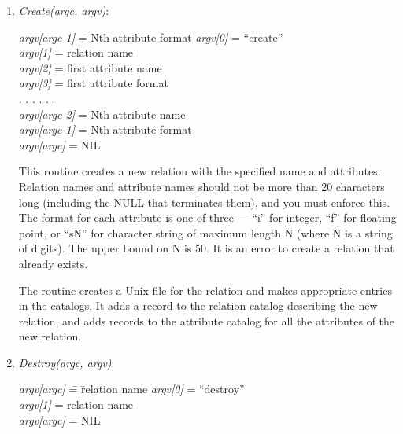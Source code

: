 \begin{enumerate}
\item\emph{Create(argc, argv)}:
\begin{tabbing}
\hspace*{0.2in}\emph{argv[argc-1]} \= = \= Nth attribute format   \kill
\hspace*{0.2in}\emph{argv[0]}      \> = \> ``create''             \\
\hspace*{0.2in}\emph{argv[1]}      \> = \> relation name          \\
\hspace*{0.2in}\emph{argv[2]}      \> = \> first attribute name   \\
\hspace*{0.2in}\emph{argv[3]}      \> = \> first attribute format \\
\hspace*{0.2in}    . . .	     \>   \>   . . .                \\
\hspace*{0.2in}\emph{argv[argc-2]} \> = \> Nth attribute name     \\
\hspace*{0.2in}\emph{argv[argc-1]} \> = \> Nth attribute format   \\
\hspace*{0.2in}\emph{argv[argc]}   \> = \> NIL
\end{tabbing}

This routine creates a new relation with the specified name and
attributes.  Relation names and attribute names should not be more than
20 characters long (including the NULL that terminates them), and you
must enforce this.  The format for each attribute is one of three ---
``i'' for integer, ``f'' for floating point, or ``sN'' for character
string of maximum length N (where N is a string of digits).  The upper
bound on N is 50.  It is an error to create a relation that already
exists.

The routine creates a Unix file for the relation and makes appropriate
entries in the catalogs.  It adds a record to the relation catalog
describing the new relation, and adds records to the attribute catalog
for all the attributes of the new relation.

\item\emph{Destroy(argc, argv)}:
\begin{tabbing}
\hspace*{0.2in}\emph{argv[argc]} \= = \= relation name  \kill
\hspace*{0.2in}\emph{argv[0]}    \> = \> ``destroy''    \\
\hspace*{0.2in}\emph{argv[1]}    \> = \> relation name  \\
\hspace*{0.2in}\emph{argv[argc]} \> = \> NIL
\end{tabbing}


\end{enumerate}
